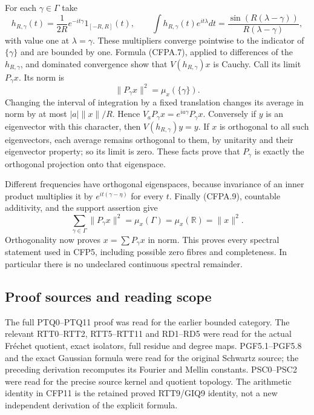 For each \(\gamma\in\Gamma\) take \[
h_{R,\gamma}(t)=\frac1{2R}e^{-it\gamma}1_{[-R,R]}(t),
\qquad
\int h_{R,\gamma}(t)e^{it\lambda}dt
=\frac{\sin(R(\lambda-\gamma))}{R(\lambda-\gamma)},
\tag{CFPA.8}
\] with value one at \(\lambda=\gamma\). These multipliers converge
pointwise to the indicator of \(\{\gamma\}\) and are bounded by one.
Formula (CFPA.7), applied to differences of the \(h_{R,\gamma}\), and
dominated convergence show that \(V(h_{R,\gamma})x\) is Cauchy. Call its
limit \(P_\gamma x\). Its norm is \[
\|P_\gamma x\|^2=\mu_x(\{\gamma\}).
\tag{CFPA.9}
\] Changing the interval of integration by a fixed translation changes
its average in norm by at most \(|a|\|x\|/R\). Hence
\(V_aP_\gamma x=e^{ia\gamma}P_\gamma x\). Conversely if \(y\) is an
eigenvector with this character, then \(V(h_{R,\gamma})y=y\). If \(x\)
is orthogonal to all such eigenvectors, each average remains orthogonal
to them, by unitarity and their eigenvector property; so its limit is
zero. These facts prove that \(P_\gamma\) is exactly the orthogonal
projection onto that eigenspace.

Different frequencies have orthogonal eigenspaces, because invariance of
an inner product multiplies it by \(e^{it(\gamma-\eta)}\) for every
\(t\). Finally (CFPA.9), countable additivity, and the support assertion
give \[
\sum_{\gamma\in\Gamma}\|P_\gamma x\|^2
=\mu_x(\Gamma)=\mu_x(\mathbb R)=\|x\|^2.
\tag{CFPA.10}
\] Orthogonality now proves \(x=\sum P_\gamma x\) in norm. This proves
every spectral statement used in CFP5, including possible zero fibres
and completeness. In particular there is no undeclared continuous
spectral remainder.

\subsection{Proof sources and reading
scope}\label{proof-sources-and-reading-scope}

The full PTQ0--PTQ11 proof was read for the earlier bounded category.
The relevant RTT0--RTT2, RTT5--RTT11 and RD1--RD5 were read for the
actual Fréchet quotient, exact isolators, full residue and degree maps.
PGF5.1--PGF5.8 and the exact Gaussian formula were read for the original
Schwartz source; the preceding derivation recomputes its Fourier and
Mellin constants. PSC0--PSC2 were read for the precise source kernel and
quotient topology. The arithmetic identity in CFP11 is the retained
proved RTT9/GIQ9 identity, not a new independent derivation of the
explicit formula.

